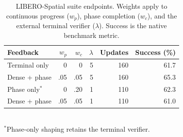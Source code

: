\begin{table}[!htb]
\caption{LIBERO-Spatial suite endpoints. Weights apply to continuous progress ($w_p$), phase completion ($w_c$), and the external terminal verifier ($\lambda$). Success is the native benchmark metric.}
\label{tab:libero}\centering\small
\begin{tabular}{@{}lrrrrr@{}}\toprule
Feedback & $w_p$ & $w_c$ & $\lambda$ & Updates & Success (\%)\\\midrule
Terminal only & 0 & 0 & 5 & 160 & 61.7\\
Dense + phase & .05 & .05 & 5 & 160 & 65.3\\\midrule
Phase only$^*$ & 0 & .20 & 1 & 110 & 62.3\\
Dense + phase & .05 & .05 & 1 & 110 & 61.0\\\bottomrule
\end{tabular}\\[2pt]
\footnotesize $^*$Phase-only shaping retains the terminal verifier.
\end{table}
